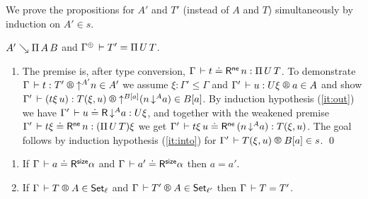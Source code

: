 \documentclass[acmlarge,review,anonymous]{acmart}\settopmatter{printfolios=true}
\makeatletter
\newenvironment{proof*}[1][\proofname]{\par
  \normalfont \topsep6\p@\@plus6\p@\relax
  \trivlist
  \item[\@proofindent\hskip\labelsep
        {\@proofnamefont #1\@addpunct{.}}]\ignorespaces
}{%
  \endtrivlist\@endpefalse
}
\makeatother
\begin{document}
\begin{proof*}
We prove the propositions for $A'$ and $T'$ (instead of $A$ and $T$)
simultaneously by induction on $A' \in s$.

\begin{caselist}

\nextcase $A' \searrow \Pi\,A\, B$ and $\resurrect\Gamma \der T' = \piT U T$.
\begin{enumerate}
\item
The premise is, after type conversion, $\Gamma \,\vdash t \doteq \mathsf{R}^{\mathsf{ne}}\, n : \Pi\,U\, T$.
To demonstrate $\LR \Gamma t {T'} {\up {A'} n} {A'}$ we assume
$\xi : \Gamma' \leq \Gamma$ and $\LR{\Gamma'}{u}{U\xi} a A$ and show
$\LR{\Gamma'} {(t\xi\,u)} {T(\xi,u)} {\up{B[a]}(n\,\down A a)} {B[a]}$.
By induction hypothesis (\ref{it:out}) we have $\Gamma' \,\vdash u \doteq \mathsf{R}\, \mathord{\downarrow^{A}} a : U\xi$, and
together with the weakened premise $\Gamma' \,\vdash t\xi \doteq \mathsf{R}^{\mathsf{ne}}\, n : (\Pi\,U\, T) \xi$ we get
$\Gamma' \,\vdash t\xi\, u \doteq \mathsf{R}^{\mathsf{ne}}\, (n\,\mathord{\downarrow^{A}} a) : T(\xi,u)$.
The goal follows by induction hypothesis (\ref{it:into}) for
$\LRTS{\Gamma'}{T(\xi,u)}{B[a]} s$.
\qed
\end{enumerate}
\end{caselist}
\end{proof*}

\begin{corollary}
\label{cor:oneone}
\bla
\begin{enumerate}
\item
If\/ $\Gamma \,\vdash a \doteq \mathsf{R}^{\mathsf{size}} \alpha$ and $\Gamma \,\vdash a' \doteq \mathsf{R}^{\mathsf{size}} \alpha$ then $a = a'$.
\item
If\/ $\LRT \Gamma T A \ell$ and $\LRT \Gamma {T'} A {\ell'}$ then $\Gamma \,\vdash T = T'$.
\end{enumerate}
\end{corollary}
\end{document}
